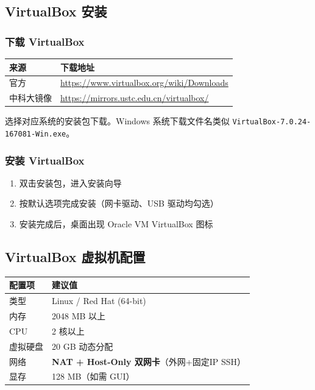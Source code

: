 \documentclass[12pt,a4paper]{ctexart}
\begin{document}
\subsection{VirtualBox 安装}

\subsubsection{下载 VirtualBox}

\begin{table}[h]
\centering
\begin{tabular}{p{3cm}p{10cm}}
\toprule
来源       & 下载地址 \\
\midrule
官方       & \url{https://www.virtualbox.org/wiki/Downloads} \\
中科大镜像  & \url{https://mirrors.ustc.edu.cn/virtualbox/} \\
\bottomrule
\end{tabular}
\end{table}

选择对应系统的安装包下载。Windows 系统下载文件名类似 \texttt{VirtualBox-7.0.24-167081-Win.exe}。

\subsubsection{安装 VirtualBox}

\begin{enumerate}[label=\arabic*.,leftmargin=*]
  \item 双击安装包，进入安装向导
  \item 按默认选项完成安装（网卡驱动、USB 驱动均勾选）
  \item 安装完成后，桌面出现 Oracle VM VirtualBox 图标
\end{enumerate}

\subsection{VirtualBox 虚拟机配置}

\begin{table}[h]
\centering
\begin{tabular}{ll}
\toprule
配置项  & 建议值 \\
\midrule
类型    & Linux / Red Hat (64-bit) \\
内存    & 2048 MB 以上 \\
CPU     & 2 核以上 \\
虚拟硬盘 & 20 GB 动态分配 \\
网络    & \textbf{NAT + Host-Only 双网卡}（外网+固定IP SSH） \\
显存    & 128 MB（如需 GUI） \\
\bottomrule
\end{tabular}
\end{table}
\end{document}
